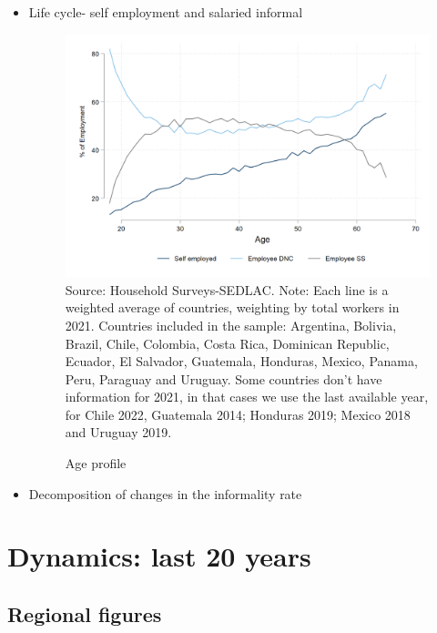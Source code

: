 \documentclass[english]{article}
\begin{document}
\begin{itemize}
\begin{itemize}
\item Life cycle- self employment and salaried informal
 \begin{figure}[!htb]
        \justifying
        \caption{Age profile}     
        \includegraphics[scale=.3]{latex/figures/Snapshot/age_profile.png}
        \label{fig:age_pro}
        \footnotesize{Source: Household Surveys-SEDLAC.}
        \footnotesize{Note: Each line is a weighted average of countries, weighting by total workers in 2021. Countries included in the sample: Argentina, Bolivia, Brazil, Chile, Colombia, Costa Rica, Dominican Republic, Ecuador, El Salvador, Guatemala, Honduras, Mexico, Panama, Peru, Paraguay and Uruguay. Some countries don’t have information for 2021, in that cases we use the last available year, for Chile 2022, Guatemala 2014; Honduras 2019; Mexico 2018 and Uruguay 2019.}
        \end{figure}
\item Decomposition of changes in the informality rate

\end{itemize}

     
     
\section{Dynamics: last 20 years}  

\subsection{Regional figures}


\end{itemize}
\end{document}
